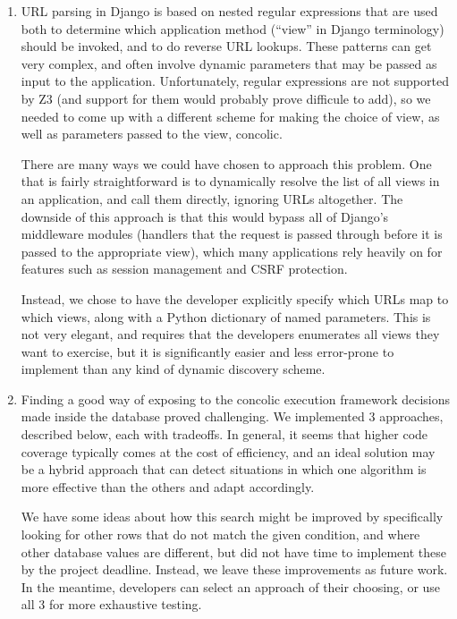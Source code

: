 \documentclass{scrartcl}
\begin{document}
\begin{enumerate}
\item URL parsing in Django is based on nested regular expressions that
  are used both to determine which application method (``view''
  in Django terminology) should be invoked, and to do reverse URL
  lookups. These patterns can get very complex, and often involve
  dynamic parameters that may be passed as input to the
  application. Unfortunately, regular expressions are not
  supported by Z3 (and support for them would probably prove
  difficule to add), so we needed to come up with a different
  scheme for making the choice of view, as well as parameters
  passed to the view, concolic.

  There are many ways we could have chosen to approach this
  problem. One that is fairly straightforward is to dynamically
  resolve the list of all views in an application, and call them
  directly, ignoring URLs altogether.  The downside of this
  approach is that this would bypass all of Django's middleware
  modules (handlers that the request is passed through before it
  is passed to the appropriate view), which many applications
  rely heavily on for features such as session management and
  CSRF protection.

  Instead, we chose to have the developer explicitly specify
  which URLs map to which views, along with a Python dictionary
  of named parameters. This is not very elegant, and requires
  that the developers enumerates all views they want to exercise,
  but it is significantly easier and less error-prone to
  implement than any kind of dynamic discovery scheme.

\item Finding a good way of exposing to the concolic execution framework
  decisions made inside the database proved challenging. We implemented 3
  approaches, described below, each with tradeoffs. In general, it seems
  that higher code coverage typically comes at the cost of efficiency, and an
  ideal solution may be a hybrid approach that can detect situations in which
  one algorithm is more effective than the others and adapt accordingly.

  We have some ideas about how this search might be improved by
  specifically looking for other rows that do not match the given
  condition, and where other database values are different, but
  did not have time to implement these by the project deadline.
  Instead, we leave these improvements as future work. In the
  meantime, developers can select an approach of their choosing, or use all 3
  for more exhaustive testing.


\end{enumerate}
\end{document}
